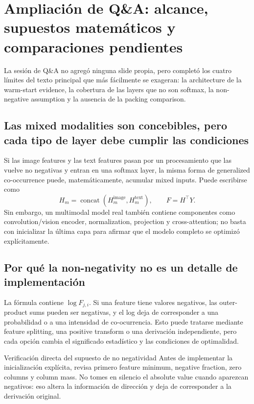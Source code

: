 \documentclass[a4paper]{article}
\begin{document}
\section{Ampliación de Q\&A: alcance, supuestos matemáticos y comparaciones pendientes}

La sesión de Q\&A no agregó ninguna slide propia, pero completó los cuatro límites del texto principal que más fácilmente se exageran: la architecture de la warm-start evidence, la cobertura de las layers que no son softmax, la non-negative assumption y la ausencia de la packing comparison.

\subsection{Las mixed modalities son concebibles, pero cada tipo de layer debe cumplir las condiciones}

Si las image features y las text features pasan por un procesamiento que las vuelve no negativas y entran en una softmax layer, la misma forma de generalized co-occurrence puede, matemáticamente, acumular mixed inputs. Puede escribirse como
\[
H_m=\operatorname{concat}(H_m^{\text{image}},H_m^{\text{text}}),
\qquad F=H^\top Y.
\]
Sin embargo, un multimodal model real también contiene componentes como convolution/vision encoder, normalization, projection y cross-attention; no basta con inicializar la última capa para afirmar que el modelo completo se optimizó explícitamente.


\subsection{Por qué la non-negativity no es un detalle de implementación}

La fórmula contiene $\log F_{j,i}$. Si una feature tiene valores negativos, las outer-product sums pueden ser negativas, y el log deja de corresponder a una probabilidad o a una intensidad de co-ocurrencia. Esto puede tratarse mediante feature splitting, una positive transform o una derivación independiente, pero cada opción cambia el significado estadístico y las condiciones de optimalidad.

\begin{importantbox}{Verificación directa del supuesto de no negatividad}
Antes de implementar la inicialización explícita, revisa primero feature minimum, negative fraction, zero columns y column mass. No tomes en silencio el absolute value cuando aparezcan negativos: eso altera la información de dirección y deja de corresponder a la derivación original.
\end{importantbox}
\end{document}
